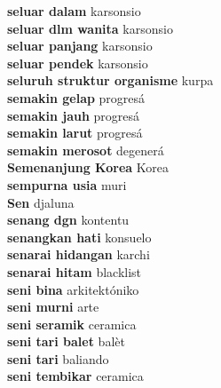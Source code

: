 \textbf{ seluar dalam  } karsonsio \\
\textbf{ seluar dlm wanita  } karsonsio \\
\textbf{ seluar panjang  } karsonsio \\
\textbf{ seluar pendek  } karsonsio \\
\textbf{ seluruh struktur organisme  } kurpa \\
\textbf{ semakin gelap  } progresá \\
\textbf{ semakin jauh  } progresá \\
\textbf{ semakin larut  } progresá \\
\textbf{ semakin merosot  } degenerá \\
\textbf{ Semenanjung Korea  } Korea \\
\textbf{ sempurna usia  } muri \\
\textbf{ Sen  } djaluna \\
\textbf{ senang dgn  } kontentu \\
\textbf{ senangkan hati  } konsuelo \\
\textbf{ senarai hidangan  } karchi \\
\textbf{ senarai hitam  } blacklist \\
\textbf{ seni bina  } arkitektóniko \\
\textbf{ seni murni  } arte \\
\textbf{ seni seramik  } ceramica \\
\textbf{ seni tari balet  } balèt \\
\textbf{ seni tari  } baliando \\
\textbf{ seni tembikar  } ceramica \\
